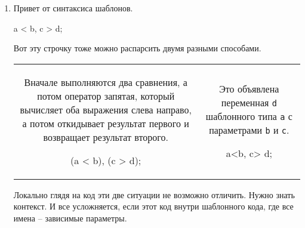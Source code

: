 \begin{enumerate}
\begin{enumerate}
\item Привет от синтаксиса шаблонов.
\begin{cppcode}
a < b, c > d;
\end{cppcode}
Вот эту строчку тоже можно распарсить двумя разными способами.
\begin{center}
\begin{tabular}{cc}
{
\begin{minipage}[b]{7cm}
Вначале выполняются два сравнения, а потом оператор запятая, который вычисляет оба выражения слева направо, а потом откидывает результат первого и возвращает результат второго.
\begin{cppcode}[numbers=none]
(a < b), (c > d);
\end{cppcode}
\end{minipage}
}&{
\begin{minipage}[b]{7cm}
Это объявлена переменная \verb"d" шаблонного типа \verb"a" с параметрами \verb"b" и \verb"c".
\begin{cppcode}[numbers=none]
a<b, c> d;
\end{cppcode}
\end{minipage}
}\\
\end{tabular}
\end{center}
Локально глядя на код эти две ситуации не возможно отличить.
Нужно знать контекст.
И все усложняется, если этот код внутри шаблонного кода, где все имена -- зависимые параметры.
\end{enumerate}


\end{enumerate}

